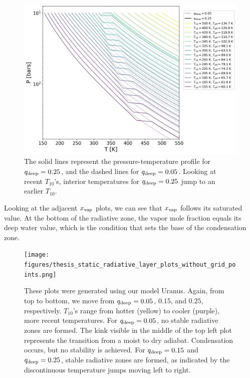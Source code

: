 \documentclass[11pt]{ucscthesisbs}
\begin{document}
\begin{figure}[ht]
 \centerline{
  \includegraphics[scale=0.7]{figures/thesis_static_radiative_layer_plot_diff_qdeep_overlay.png}
 }
\caption[Impact of Radiative Layer on T10]
{The solid lines represent the pressure-temperature profile for $q_{\rm deep} = 0.25$, and the dashed lines for $q_{\rm deep}=0.05$. Looking at recent $T_{10}$'s, interior temperatures for $q_{\rm deep} = 0.25$ jump to an earlier $T_{10}$.}
\label{fig:overlay}
\end{figure}

Looking at the adjacent $x_{\rm vap}$ plots, we can see that $x_{\rm vap}$ follows its saturated value. At the bottom of the radiative zone, the vapor mole fraction equals its deep water value, which is the condition that sets the base of the condensation zone. 

\begin{figure}[ht]
 \centerline{
  \texttt{[image: figures/thesis\_static\_radiative\_layer\_plots\_without\_grid\_points.png]}
 }
\caption[Formation of Radiative Zone]
{These plots were generated using our model Uranus. Again, from top to bottom, we move from $q_{\rm deep} = 0.05$, $0.15$, and $0.25$, respectively. $T_{10}$'s range from hotter (yellow) to cooler (purple), more recent temperatures. For $q_{\rm deep} = 0.05$, no stable radiative zones are formed. The kink visible in the middle of the top left plot represents the transition from a moist to dry adiabat. Condensation occurs, but no stability is achieved. For $q_{\rm deep} = 0.15$ and $q_{\rm deep} = 0.25$, stable radiative zones are formed, as indicated by the discontinuous temperature jumps moving left to right.}
\label{fig:radiative}
\end{figure}
\end{document}
